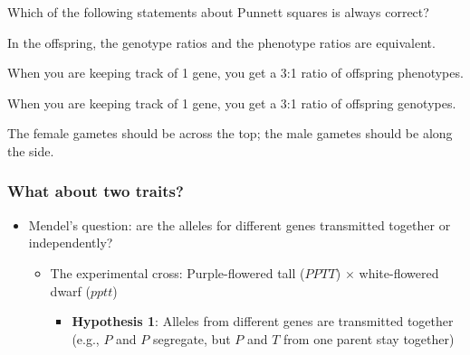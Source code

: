 \begin{frame}
    \begin{clickerquestion}
        \item Which of the following statements about Punnett squares is always
            correct?
        \begin{clickeroptions}
            \item In the offspring, the genotype ratios and the phenotype
                ratios are equivalent.
            \item {}
            \item When you are keeping track of 1 gene, you get a 3:1 ratio of
                offspring phenotypes.
            \item When you are keeping track of 1 gene, you get a 3:1 ratio of
                offspring genotypes.
            \item The female gametes should be across the top; the male gametes
                should be along the side.
        \end{clickeroptions}
    \end{clickerquestion}
\end{frame}

\begin{frame}
    \frametitle{What about two traits?}
    \begin{itemize}[<+->]
        \item Mendel's question: are the alleles for different genes
            transmitted together or independently?
            \begin{itemize}
                \item The experimental cross: Purple-flowered tall ($PPTT$)
                    $\times$ white-flowered dwarf ($pptt$)
                    \begin{itemize}
                        \item \textbf{Hypothesis 1}: Alleles from different
                            genes are transmitted together (e.g., $P$ and $P$
                            segregate, but $P$ and $T$ from one parent stay
                            together)
                    \end{itemize}
            \end{itemize}
    \end{itemize}
\end{frame}

